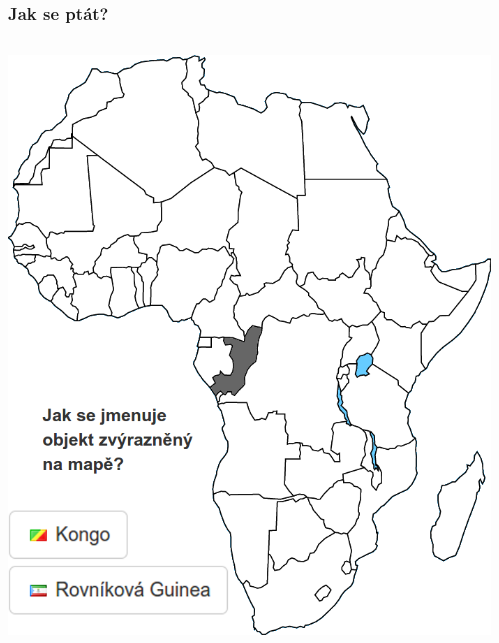 \documentclass[xcolor=svgnames]{beamer}
\begin{document}
\begin{frame}
	\frametitle{Jak se ptát?}
	\begin{columns}
		\begin{column}{.5\textwidth}
			\begin{center}
				\includegraphics[width=\textwidth]{img/slepemapy_mcq}
			\end{center}
		\end{column}
		\begin{column}{.5\textwidth}
			\begin{center}

\end{center}
\end{column}
\end{columns}
\end{frame}
\end{document}
